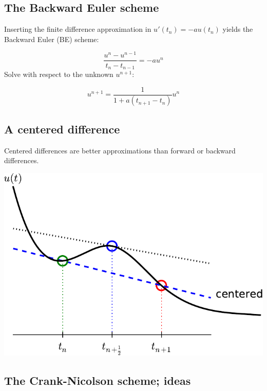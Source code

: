 \documentclass[%
oneside,                 %
final,                   %
10pt]{article}
\begin{document}
\subsection*{The Backward Euler scheme}


Inserting the finite difference approximation in $u'(t_n)=-au(t_n)$ yields
the Backward Euler (BE) scheme:

\begin{equation}
\frac{u^{n}-u^{n-1}}{t_{n}-t_{n-1}} = -a u^n
\label{decay:BE0}
\end{equation}
Solve with respect to the unknown $u^{n+1}$:

\begin{equation}
u^{n+1} = \frac{1}{1+ a(t_{n+1}-t_n)} u^n
\label{decay:BE}
\end{equation}

\subsection*{A centered difference}

Centered differences are better approximations than forward or
backward differences.



\centerline{\includegraphics[width=0.8\linewidth]{fig-alg/fd_centered_CN.pdf}}



\subsection*{The Crank-Nicolson scheme; ideas}
\label{decay:schemes:CN}

\end{document}
